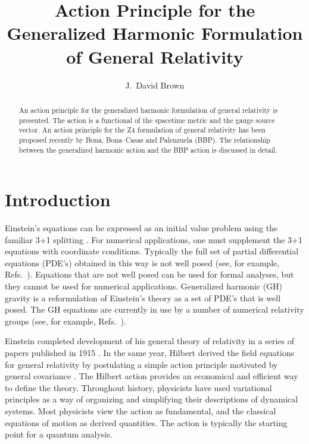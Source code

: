 \documentclass[letterpaper,nofootinbib,prd,amsmath,twocolumn]{revtex4-1}
\begin{document}

\title{Action Principle for the Generalized Harmonic Formulation of General Relativity}
\author{J.~David Brown}

\begin{abstract}
An action principle for the generalized harmonic formulation of general relativity is presented. The 
action is a functional of the spacetime metric and the gauge source vector. An action principle 
for the Z4 formulation of general relativity has been proposed recently by 
Bona, Bona--Casas and Palenzuela (BBP). The relationship between the generalized harmonic action and 
the BBP action is discussed in detail. 
\end{abstract}
\maketitle

\section{Introduction}
Einstein's equations can be expressed as an initial value problem using the familiar 3+1 
splitting \cite{Smarr:York,ADM:Witten}.
For numerical applications, one must supplement the 3+1 equations with coordinate conditions. Typically the full set of 
partial differential equations (PDE's) obtained in this way is not well posed (see, for example, 
Refs.~\cite{Reula:1998ty,Calabrese:2002ej}). 
Equations that are not well posed can be used for formal analyses, but they cannot be used for 
numerical applications. Generalized harmonic (GH) gravity is a reformulation of Einstein's theory as a set of 
PDE's that is well posed. The GH equations are currently in use by a number of numerical relativity 
groups (see, for example, Refs.~\cite{Pretorius:2006tp,Lindblom:2005qh,Anderson:2007kz}).

Einstein completed development of his general theory of relativity in a series of papers published in 1915 
\cite{Einstein:1915by,Einstein:1915bz,Einstein:1915ca}.
In the same year, Hilbert derived the field equations for general relativity by postulating a simple action principle 
motivated by  general covariance \cite{Hilbert:1915tx}. 
The Hilbert action provides an economical and efficient way to 
define the theory. Throughout history, physicists have used variational principles as a way of organizing and simplifying their 
descriptions of dynamical systems. Most physicists view the action as fundamental, and the classical equations of motion 
as derived quantities. The action  is typically the starting point for a quantum analysis. 
\end{document}
